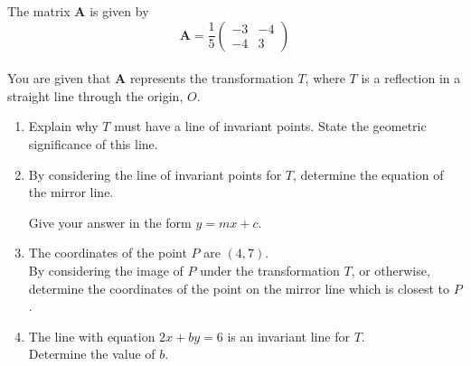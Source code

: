 \documentclass[leqno]{article}
\begin{document}
\begin{enumerate}[
  label=\textbf{\arabic*.},
  leftmargin=*,
  topsep=0pt,
  partopsep=0pt,
  parsep=0pt
]
\newpage

\questionitem

The matrix $\mathbf{A}$ is given by
\[
\mathbf{A} = \frac{1}{5}\begin{pmatrix}-3 & -4 \\ -4 & 3\end{pmatrix}
\] \\
You are given that $\mathbf{A}$ represents the transformation $T$, where $T$ is a reflection in a straight line through the origin, $O$. \\
\begin{enumerate}[label=\textbf{(\alph*)}]
  \item Explain why $T$ must have a line of invariant points. State the geometric significance of this line.  \\
  \item By considering the line of invariant points for $T$, determine the equation of the mirror line.

Give your answer in the form $y = mx + c$.  \\
  \item The coordinates of the point $P$ are $(4, 7)$. \\
  By considering the image of $P$ under the transformation $T$, or otherwise, determine the coordinates of the point on the mirror line which is closest to $P$.  \\
  \item The line with equation $2x + by = 6$ is an invariant line for $T$. \\
  Determine the value of $b$.  \\
\end{enumerate}

\newpage


\questionitem


\end{enumerate}
\end{document}
